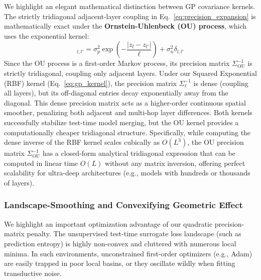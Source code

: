 \begin{remark}
\label{rem:rbf_vs_ou}
We highlight an elegant mathematical distinction between GP covariance kernels.
The strictly tridiagonal adjacent-layer coupling in
Eq.~\ref{eq:precision_expansion} is mathematically exact under the
\textbf{Ornstein-Uhlenbeck (OU) process}, which uses the exponential kernel:
\begin{equation}
[\Sigma_{\text{OU}}]_{l, l'} = \sigma_p^2 \exp\left( - \frac{|z_l -
z_{l'}|}{\ell} \right) + \sigma_n^2 \delta_{l, l'}
\label{eq:ou_kernel}
\end{equation}
Since the OU process is a first-order Markov process, its precision matrix
$\Sigma_{\text{OU}}^{-1}$ is strictly tridiagonal, coupling only adjacent
layers. Under our Squared Exponential (RBF) kernel (Eq.~\ref{eq:gp_kernel}), the
precision matrix $\Sigma_{\ell}^{-1}$ is dense (coupling all layers), but its
off-diagonal entries decay exponentially away from the diagonal. This dense
precision matrix acts as a higher-order continuous spatial smoother, penalizing
both adjacent and multi-hop layer differences. Both kernels successfully
stabilize test-time model merging, but the OU kernel provides a computationally
cheaper tridiagonal structure. Specifically, while computing the dense inverse
of the RBF kernel scales cubically as $O(L^3)$, the OU precision matrix
$\Sigma_{\text{OU}}^{-1}$ has a closed-form analytical tridiagonal expression
that can be computed in linear time $O(L)$ without any matrix inversion,
offering perfect scalability for ultra-deep architectures (e.g., models with
hundreds or thousands of layers).
\end{remark}

\subsubsection{Landscape-Smoothing and Convexifying Geometric Effect}

We highlight an important optimization advantage of our quadratic
precision-matrix penalty. The unsupervised test-time surrogate loss landscape
(such as prediction entropy) is highly non-convex and cluttered with numerous
local minima. In such environments, unconstrained first-order optimizers
(e.g., Adam) are easily trapped in poor local basins, or they oscillate wildly
when fitting transductive noise.

